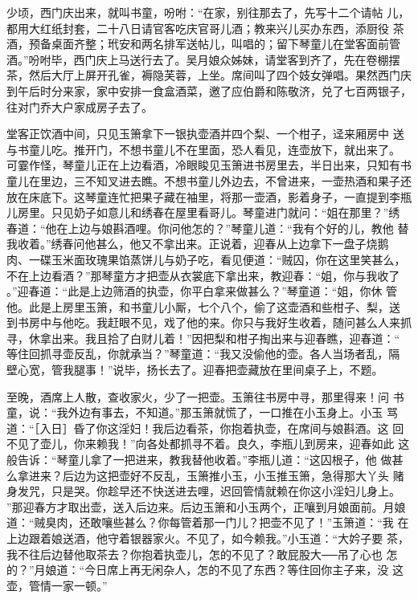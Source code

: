 少顷，西门庆出来，就叫书童，吩咐：“在家，别往那去了，先写十二个请帖
儿，都用大红纸封套，二十八日请官客吃庆官哥儿酒；教来兴儿买办东西，添厨役
茶酒，预备桌面齐整；玳安和两名排军送帖儿，叫唱的；留下琴童儿在堂客面前管
酒。”吩咐毕，西门庆上马送行去了。吴月娘众姊妹，请堂客到齐了，先在卷棚摆
茶，然后大厅上屏开孔雀，褥隐芙蓉，上坐。席间叫了四个妓女弹唱。果然西门庆
到午后时分来家，家中安排一食盒酒菜，邀了应伯爵和陈敬济，兑了七百两银子，
往对门乔大户家成房子去了。

堂客正饮酒中间，只见玉箫拿下一银执壶酒并四个梨、一个柑子，迳来厢房中
送与书童儿吃。推开门，不想书童儿不在里面，恐人看见，连壶放下，就出来了。
可霎作怪，琴童儿正在上边看酒，冷眼睃见玉箫进书房里去，半日出来，只知有书
童儿在里边，三不知叉进去瞧。不想书童儿外边去，不曾进来，一壶热酒和果子还
放在床底下。这琴童连忙把果子藏在袖里，将那一壶酒，影着身子，一直提到李瓶
儿房里。只见奶子如意儿和绣春在屋里看哥儿。琴童进门就问：“姐在那里？”绣
春道：“他在上边与娘斟酒哩。你问他怎的？”琴童儿道：“我有个好的儿，教他
替我收着。”绣春问他甚么，他又不拿出来。正说着，迎春从上边拿下一盘子烧鹅
肉、一碟玉米面玫瑰果馅蒸饼儿与奶子吃，看见便道：“贼囚，你在这里笑甚么，
不在上边看酒？”那琴童方才把壶从衣裳底下拿出来，教迎春：“姐，你与我收了
。”迎春道：“此是上边筛酒的执壶，你平白拿来做甚么？”琴童道：“姐，你休
管他。此是上房里玉箫，和书童儿小厮，七个八个，偷了这壶酒和些柑子、梨，送
到书房中与他吃。我赶眼不见，戏了他的来。你只与我好生收着，随问甚么人来抓
寻，休拿出来。我且拾了白财儿着！”因把梨和柑子掏出来与迎春瞧，迎春道：“
等住回抓寻壶反乱，你就承当？”琴童道：“我又没偷他的壶。各人当场者乱，隔
壁心宽，管我腿事！”说毕，扬长去了。迎春把壶藏放在里间桌子上，不题。

至晚，酒席上人散，查收家火，少了一把壶。玉箫往书房中寻，那里得来！问
书童，说：“我外边有事去，不知道。”那玉箫就慌了，一口推在小玉身上。小玉
骂道：“［入日］昏了你这淫妇！我后边看茶，你抱着执壶，在席间与娘斟酒。这
回不见了壶儿，你来赖我！”向各处都抓寻不着。良久，李瓶儿到房来，迎春如此
这般告诉：“琴童儿拿了一把进来，教我替他收着。”李瓶儿道：“这囚根子，他
做甚么拿进来？后边为这把壶好不反乱，玉箫推小玉，小玉推玉箫，急得那大丫头
赌身发咒，只是哭。你趁早还不快送进去哩，迟回管情就赖在你这小淫妇儿身上。
”那迎春方才取出壶，送入后边来。后边玉箫和小玉两个，正嚷到月娘面前。月娘
道：“贼臭肉，还敢嚷些甚么？你每管着那一门儿？把壶不见了！”玉箫道：“我
在上边跟着娘送酒，他守着银器家火。不见了，如今赖我。”小玉道：“大妗子要
茶，我不往后边替他取茶去？你抱着执壶儿，怎的不见了？敢屁股大──吊了心也
怎的？”月娘道：“今日席上再无闲杂人，怎的不见了东西？等住回你主子来，没
这壶，管情一家一顿。”

